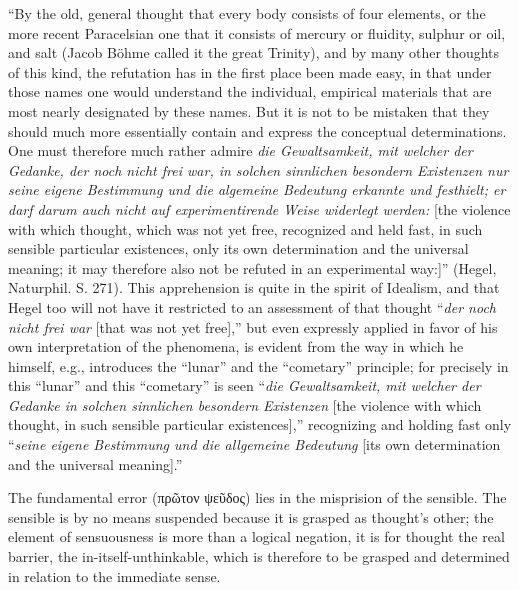 \documentclass[12pt]{book}
\begin{document}
``By the old, general thought that every body consists of four elements, or the
more recent Paracelsian one that it consists of mercury or fluidity, sulphur or
oil, and salt (Jacob Böhme called it the great Trinity), and by many other
thoughts of this kind, the refutation has in the first place been made easy, in
that under those names one would understand the individual, empirical materials
that are most nearly designated by these names. But it is not to be mistaken that
they should much more essentially contain and express the conceptual
determinations. One must therefore much rather admire
\textit{die Gewaltsamkeit, mit welcher der Gedanke, der noch nicht frei war, in
solchen sinnlichen besondern Existenzen nur seine eigene Bestimmung und die
algemeine Bedeutung erkannte und festhielt; er darf darum auch nicht auf
experimentirende Weise widerlegt werden:} [the violence with which thought, which
was not yet free, recognized and held fast, in such sensible particular
existences, only its own determination and the universal meaning; it may therefore
also not be refuted in an experimental way:]'' (Hegel, Naturphil. S. 271).
This apprehension is quite in the spirit of Idealism, and that Hegel too will not
have it restricted to an assessment of that thought ``\textit{der noch nicht frei
war} [that was not yet free],'' but even expressly applied in favor of his own
interpretation of the phenomena, is evident from the way in which he himself, e.g.,
introduces the ``lunar'' and the ``cometary'' principle; for precisely in this
``lunar'' and this ``cometary'' is seen ``\textit{die Gewaltsamkeit, mit welcher
der Gedanke in solchen sinnlichen besondern Existenzen} [the violence with which
thought, in such sensible particular existences],'' recognizing and holding fast
only ``\textit{seine eigene Bestimmung und die allgemeine Bedeutung} [its own
determination and the universal meaning].''

The fundamental error (πρῶτον ψεῦδος) lies in the misprision of the sensible. The
sensible is by no means suspended because it is grasped as thought's other; the
element of sensuousness is more than a logical negation, it is for thought the
real barrier, the in-itself-unthinkable, which is therefore to be grasped and
determined in relation to the immediate sense.
\end{document}
